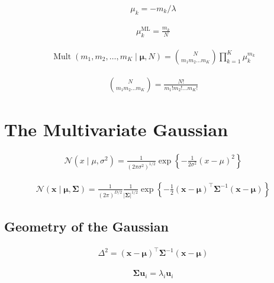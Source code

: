 \documentclass{article}
\begin{document}
\begin{align*}
\mu_{k}=-m_{k} / \lambda
\tag{3.21}
\end{align*}

\begin{align*}
\mu_{k}^{\mathrm{ML}}=\frac{m_{k}}{N}
\tag{3.22}
\end{align*}

\begin{align*}
\operatorname{Mult}\left(m_{1}, m_{2}, \ldots, m_{K} \mid \boldsymbol{\mu}, N\right)=\binom{N}{m_{1} m_{2} \ldots m_{K}} \prod_{k=1}^{K} \mu_{k}^{m_{k}}
\tag{3.23}
\end{align*}

\begin{align*}
\binom{N}{m_{1} m_{2} \ldots m_{K}}=\frac{N!}{m_{1}!m_{2}!\ldots m_{K}!}
\tag{3.24}
\end{align*}

\section{The Multivariate Gaussian}

\begin{align*}
\mathcal{N}\left(x \mid \mu, \sigma^{2}\right) = \frac{1}{\left(2 \pi \sigma^{2}\right)^{1 / 2}} \exp \left\{-\frac{1}{2 \sigma^{2}}(x-\mu)^{2}\right\} 
\tag{3.25}
\end{align*}

\begin{align*}
\mathcal{N}(\mathbf{x} \mid \boldsymbol{\mu}, \boldsymbol{\Sigma}) = \frac{1}{(2 \pi)^{D / 2}} \frac{1}{|\boldsymbol{\Sigma}|^{1 / 2}} \exp \left\{-\frac{1}{2}(\mathbf{x}-\boldsymbol{\mu})^{\top} \boldsymbol{\Sigma}^{-1}(\mathbf{x}-\boldsymbol{\mu})\right\} 
\tag{3.26}
\end{align*}

\subsection{Geometry of the Gaussian}

\begin{align*}
\Delta^{2} = (\mathbf{x}-\boldsymbol{\mu})^{\top} \boldsymbol{\Sigma}^{-1}(\mathbf{x}-\boldsymbol{\mu}) 
\tag{3.27}
\end{align*}

\begin{align*}
\boldsymbol{\Sigma} \mathbf{u}_{i} = \lambda_{i} \mathbf{u}_{i} 
\tag{3.28}
\end{align*}
\end{document}
